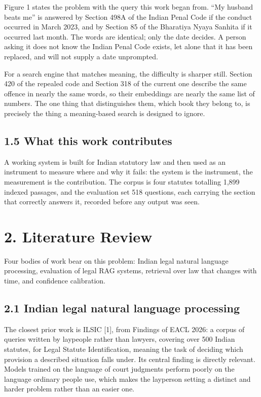 \documentclass[12pt,a4paper]{article}
\begin{document}
Figure 1 states the problem with the query this work began from. ``My husband beats me'' is answered by Section 498A of the Indian Penal Code if the conduct occurred in March 2023, and by Section 85 of the Bharatiya Nyaya Sanhita if it occurred last month. The words are identical; only the date decides. A person asking it does not know the Indian Penal Code exists, let alone that it has been replaced, and will not supply a date unprompted.

For a search engine that matches meaning, the difficulty is sharper still. Section 420 of the repealed code and Section 318 of the current one describe the same offence in nearly the same words, so their embeddings are nearly the same list of numbers. The one thing that distinguishes them, which book they belong to, is precisely the thing a meaning-based search is designed to ignore.

\subsection*{1.5 What this work contributes}
A working system is built for Indian statutory law and then used as an instrument to measure where and why it fails: the system is the instrument, the measurement is the contribution. The corpus is four statutes totalling 1,899 indexed passages, and the evaluation set 518 questions, each carrying the section that correctly answers it, recorded before any output was seen.

\section*{2. Literature Review}
Four bodies of work bear on this problem: Indian legal natural language processing, evaluation of legal RAG systems, retrieval over law that changes with time, and confidence calibration.

\subsection*{2.1 Indian legal natural language processing}
The closest prior work is ILSIC [1], from Findings of EACL 2026: a corpus of queries written by laypeople rather than lawyers, covering over 500 Indian statutes, for Legal Statute Identification, meaning the task of deciding which provision a described situation falls under. Its central finding is directly relevant. Models trained on the language of court judgments perform poorly on the language ordinary people use, which makes the layperson setting a distinct and harder problem rather than an easier one.
\end{document}
